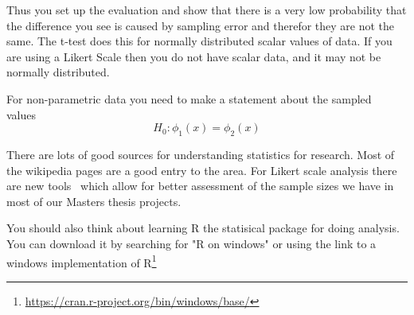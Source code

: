Thus you set up the evaluation and show that there is a very low probability that the difference you see is caused by sampling error and therefor they are not the same.  The t-test does this for normally distributed scalar values of data. If you are using a Likert Scale then you do not have scalar data, and it may not be normally distributed.

For non-parametric data you need to make a statement about the sampled values~\cite{Kaptein2010}
\begin{equation} 
\label{H0sample}
    H_0 : \phi_1(x) = \phi_2(x)
\end{equation}

There are lots of good sources for understanding statistics for research.  Most of the wikipedia pages are a good entry to the area. For Likert scale analysis there are new tools~\cite{Kaptein2010} which allow for better assessment of the sample sizes we have in most of our Masters thesis projects.

You should also think about learning R the statisical package for doing analysis.  You can download it by searching for "R on windows" or using the link to a windows implementation of R\footnote{\url{https://cran.r-project.org/bin/windows/base/}}


